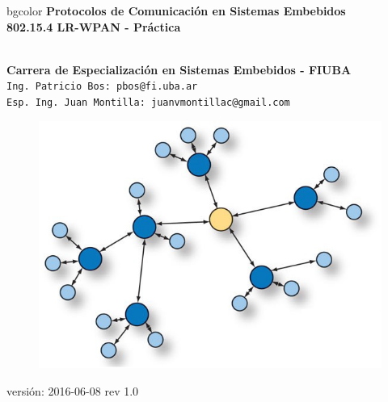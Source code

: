 \documentclass[aspectratio=169]{beamer}
\begin{document}
\begingroup
\makeatletter
\setlength{\hoffset}{-.5\beamer@sidebarwidth}
\makeatother
\begin{frame}
\begin{center}
\hfill
    \begin{beamercolorbox}[center,dp=3ex,ht=10.25ex, wd=1\linewidth]{bgcolor}
        \Large\textbf{Protocolos de Comunicación en Sistemas Embebidos}\\
        \huge\textbf{802.15.4 LR-WPAN - Práctica}
    \end{beamercolorbox}
\hfill\hfill
\\
\vspace{5px}
\textbf{Carrera de Especialización en Sistemas Embebidos - FIUBA}\\
\vspace{10px}
\texttt{Ing. Patricio Bos: pbos@fi.uba.ar}\\
\texttt{Esp. Ing. Juan Montilla: juanvmontillac@gmail.com}\\

\vspace{10px}

\begin{figure}[H]
	\includegraphics[width=.3\textwidth]{./imagenes/red.jpg}
\end{figure}	

\vspace{5px}
\tiny versión: 2016-06-08 rev 1.0 
 	  	
\end{center}
\end{frame}
\endgroup
\end{document}
